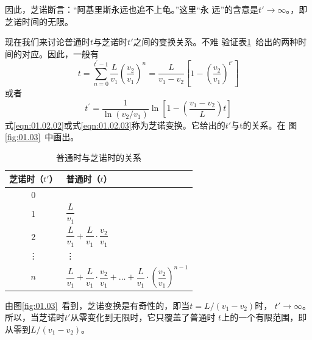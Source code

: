 因此，芝诺断言：“阿基里斯永远也追不上龟。”这里“永
远”的含意是$t'\rightarrow\infty$。，即芝诺时间的无限。

现在我们来讨论普通时$t$与芝诺时$t'$之间的变换关系。不难
验证表\ref{tab:01.02}~给出的两种时间的对应。因此，一般有
{\setlength{\mathindent}{5em}
\begin{equation}
    t=\sum_{n=0}^{t^{\prime}-1} \frac{L}{v_{1}}\left(\frac{v_{2}}{v_{1}}\right)^{n}=\frac{L}{v_{1}-v_{2}}\left[1-\left(\frac{v_{2}}{v_{1}}\right)^{t'}\right]
    \label{eqn:01.02.02}
\end{equation}}%
或者\vspace{-1.2em}
\begin{equation}
    t^{\prime}=\frac{1}{\ln \left(v_{2} / v_{1}\right)} \ln \left[1-\left(\frac{v_{1}-v_{2}}{L}\right) t\right]
    \label{eqn:01.02.03}
\end{equation}%
式\eqref{eqn:01.02.02}或式\eqref{eqn:01.02.03}称为芝诺变换。它给出的$t'$与t的关系。在
图\ref{fig:01.03}~中画出。

\begin{table}[!h]
    \renewcommand\arraystretch{1.6}
    \centering
    \vspace{-0.5em}
    \caption{普通时与芝诺时的关系}
    \label{tab:01.02}
    \begin{tabular*}{\linewidth}{c|>{\qquad}l}
        \toprule
        芝诺时（$t'$） & \hspace{7em}普通时（$t$） \\
        \midrule
        0              & 0                                                                                                                          \\
        1              & $\dfrac{L}{v_1}$                                                                                                           \\
        2              & $\dfrac{L}{v_1} + \dfrac{L}{v_1}\cdot\dfrac{v_2}{v_1}$                                                                     \\
        \vdots         & \vdots                                                                                                                     \\
        $n$            & $\dfrac{L}{v_1} + \dfrac{L}{v_1}\cdot\dfrac{v_2}{v_1} + \dots + \dfrac{L}{v_1}\cdot(\dfrac{v_2}{v_1})^{n-1} $  \\
        \bottomrule
    \end{tabular*}
\end{table}
由图\ref{fig:01.03}~看到，芝诺变换是有奇性的，即当$t=L/(v_1-v_2)$时，
$t'\rightarrow\infty$。所以，当芝诺时$t'$从零变化到无限时，它只覆盖了普通时
$t$上的一个有限范围，即从零到$ L/(v_1-v_2) $。


